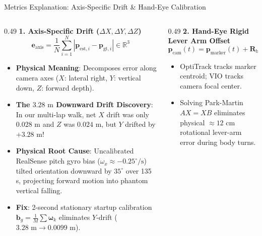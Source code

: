 \documentclass[aspectratio=169, 10pt]{beamer}
\begin{document}
\begin{frame}{Metrics Explanation: Axis-Specific Drift \& Hand-Eye Calibration}
  \begin{columns}[T]
    \begin{column}{0.49\textwidth}
      {\small \textbf{\textcolor{NavyBlue}{1. Axis-Specific Drift ($\Delta X, \Delta Y, \Delta Z$)}}}
      \begin{equation}
        \mathbf{e}_{\text{axis}} = \frac{1}{N} \sum_{i=1}^N \left| \mathbf{p}_{\text{est}, i} - \mathbf{p}_{\text{gt}, i} \right| \in \mathbb{R}^3
      \end{equation}
      \scriptsize
      \begin{itemize}
        \setlength{\itemsep}{2pt}
        \item \textbf{Physical Meaning}: Decomposes error along camera axes ($X$: lateral right, $Y$: vertical down, $Z$: forward depth).
        \item \textbf{The $3.28\text{ m}$ Downward Drift Discovery}: In our multi-lap walk, net $X$ drift was only $0.028\text{ m}$ and $Z$ was $0.024\text{ m}$, but $Y$ drifted by $+3.28\text{ m}$!
        \item \textbf{Physical Root Cause}: Uncalibrated RealSense pitch gyro bias ($\omega_x \approx -0.25^\circ/\text{s}$) tilted orientation downward by $35^\circ$ over 135 s, projecting forward motion into phantom vertical falling.
        \item \textbf{Fix}: 2-second stationary startup calibration $\mathbf{b}_g = \frac{1}{M}\sum \boldsymbol{\omega}_k$ eliminates $Y$-drift ($3.28\text{ m} \rightarrow 0.0099\text{ m}$).
      \end{itemize}
    \end{column}

    \begin{column}{0.49\textwidth}
      {\small \textbf{\textcolor{NavyBlue}{2. Hand-Eye Rigid Lever Arm Offset}}}
      \begin{equation}
        \mathbf{p}_{\text{cam}}(t) = \mathbf{p}_{\text{marker}}(t) + \mathbf{R}_{\text{body}}(t) \cdot \mathbf{t}_{\text{hand-eye}}
      \end{equation}
      \scriptsize
      \begin{itemize}
        \setlength{\itemsep}{2pt}
        \item OptiTrack tracks marker centroid; VIO tracks camera focal center.
        \item Solving Park-Martin $AX=XB$ eliminates physical $\approx 12\text{ cm}$ rotational lever-arm error during body turns.
      \end{itemize}


\end{column}
\end{columns}
\end{frame}
\end{document}
